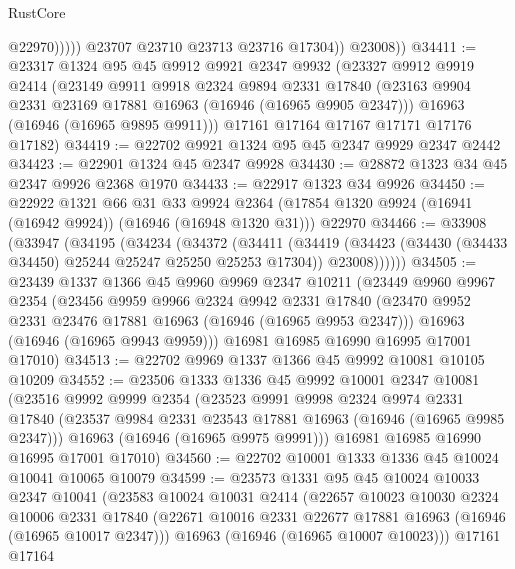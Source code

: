 \begin{lexlean}{RustCore}
\begin{coremodule}
                      @22970)))))
            @23707
            @23710
            @23713
            @23716
            @17304))
        @23008))
@34411 := @23317
    @1324
    @95
    @45
    @9912
    @9921
    @2347
    @9932
    (@23327
      @9912
      @9919
      @2414
      (@23149
        @9911
        @9918
        @2324
        @9894
        @2331
        @17840
        (@23163 @9904 @2331 @23169 @17881 @16963 (@16946 (@16965 @9905 @2347)))
        @16963
        (@16946 (@16965 @9895 @9911)))
      @17161
      @17164
      @17167
      @17171
      @17176
      @17182)
@34419 := @22702 @9921 @1324 @95 @45 @2347 @9929 @2347 @2442
@34423 := @22901 @1324 @45 @2347 @9928
@34430 := @28872 @1323 @34 @45 @2347 @9926 @2368 @1970
@34433 := @22917 @1323 @34 @9926
@34450 := @22922
    @1321
    @66
    @31
    @33
    @9924
    @2364
    (@17854 @1320 @9924 (@16941 (@16942 @9924)) (@16946 (@16948 @1320 @31)))
    @22970
@34466 := @33908
    (@33947
      (@34195
        (@34234
          (@34372
            (@34411
              (@34419
                (@34423 (@34430 (@34433 @34450) @25244 @25247 @25250 @25253 @17304))
                @23008))))))
@34505 := @23439
    @1337
    @1366
    @45
    @9960
    @9969
    @2347
    @10211
    (@23449
      @9960
      @9967
      @2354
      (@23456
        @9959
        @9966
        @2324
        @9942
        @2331
        @17840
        (@23470 @9952 @2331 @23476 @17881 @16963 (@16946 (@16965 @9953 @2347)))
        @16963
        (@16946 (@16965 @9943 @9959)))
      @16981
      @16985
      @16990
      @16995
      @17001
      @17010)
@34513 := @22702 @9969 @1337 @1366 @45 @9992 @10081 @10105 @10209
@34552 := @23506
    @1333
    @1336
    @45
    @9992
    @10001
    @2347
    @10081
    (@23516
      @9992
      @9999
      @2354
      (@23523
        @9991
        @9998
        @2324
        @9974
        @2331
        @17840
        (@23537 @9984 @2331 @23543 @17881 @16963 (@16946 (@16965 @9985 @2347)))
        @16963
        (@16946 (@16965 @9975 @9991)))
      @16981
      @16985
      @16990
      @16995
      @17001
      @17010)
@34560 := @22702 @10001 @1333 @1336 @45 @10024 @10041 @10065 @10079
@34599 := @23573
    @1331
    @95
    @45
    @10024
    @10033
    @2347
    @10041
    (@23583
      @10024
      @10031
      @2414
      (@22657
        @10023
        @10030
        @2324
        @10006
        @2331
        @17840
        (@22671 @10016 @2331 @22677 @17881 @16963 (@16946 (@16965 @10017 @2347)))
        @16963
        (@16946 (@16965 @10007 @10023)))
      @17161
      @17164

\end{coremodule}
\end{lexlean}
